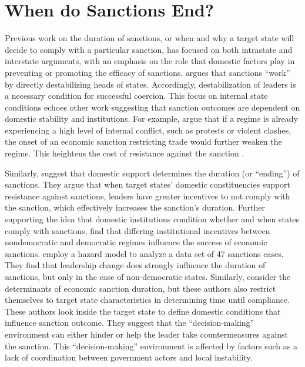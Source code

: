 \section*{When do Sanctions End?}
\label{lit}

Previous work on the duration of sanctions, or when and why a target state will decide to comply with a particular sanction, has focused on both intrastate and interstate arguments, with an emphasis on the role that domestic factors play in preventing or promoting the efficacy of sanctions. \cite{marinov2005} argues that sanctions ``work'' by directly destabilizing heads of states. Accordingly, destabilization of leaders is a necessary condition for successful coercion.  This focus on internal state conditions echoes other work suggesting that sanction outcomes are dependent on domestic stability and institutions. For example, {\cite{dashti1997}} argue that if a regime is already experiencing a high level of internal conflict, such as protests or violent clashes, the onset of an economic sanction restricting trade would further weaken the regime. This heightens the cost of resistance against the sanction \citep{dashti1997}. 

Similarly, \cite{dorussen2001} suggest that domestic support determines the duration (or ``ending'') of sanctions. They argue that when target states' domestic constituencies support resistance against sanctions, leaders have greater incentives to not comply with the sanction, which effectively increases the sanction's duration. Further supporting the idea that domestic institutions condition whether and when states comply with sanctions, \cite{lektzian2007} find that differing institutional incentives between nondemocratic and democratic regimes influence the success of economic sanctions. \cite{mcgillivray2004} employ a hazard model to analyze a data set of 47 sanctions cases. They find that leadership change does strongly influence the duration of sanctions, but only in the case of non-democratic states. Similarly, \cite{bolks2000} consider the determinants of economic sanction duration, but these authors also restrict themselves to target state characteristics in determining time until compliance. These authors look inside the target state to define domestic conditions that influence sanction outcome. They suggest that the ``decision-making'' environment can either hinder or help the leader take countermeasures against the sanction. This ``decision-making'' environment is affected by factors such as a lack of coordination between government actors and local instability. 

